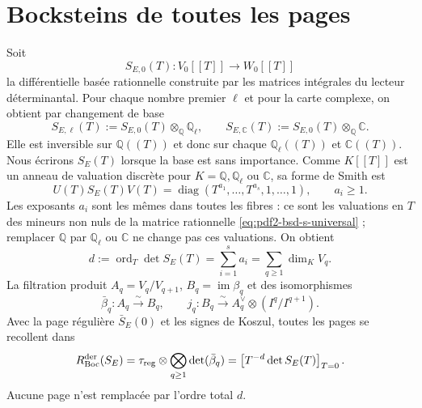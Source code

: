 \section{Bocksteins de toutes les pages}

Soit
\begin{equation}\label{eq:pdf2-bsd-s-universal}
 S_{E,0}(T):V_0[[T]]\longrightarrow W_0[[T]]
\end{equation}
la différentielle basée rationnelle construite par les matrices intégrales du
lecteur déterminantal. Pour chaque nombre premier $\ell$ et pour la carte complexe, on
obtient par changement de base
\begin{equation}\label{eq:pdf2-bsd-s-todos-ell}
 S_{E,\ell}(T):=S_{E,0}(T)\otimes_{\mathbb Q}\mathbb Q_\ell,
 \qquad
 S_{E,\mathbb C}(T):=S_{E,0}(T)\otimes_{\mathbb Q}\mathbb C.
\end{equation}
Elle est inversible sur $\mathbb Q((T))$ et donc sur chaque
$\mathbb Q_\ell((T))$ et $\mathbb C((T))$. Nous écrirons $S_E(T)$ lorsque la
base est sans importance. Comme $K[[T]]$ est un anneau de valuation discrète pour
$K=\mathbb Q,\mathbb Q_\ell$ ou $\mathbb C$, sa forme de Smith est
\begin{equation}\label{eq:pdf2-bsd-smith-t-adico}
 U(T)S_E(T)V(T)=\operatorname{diag}
 (T^{a_1},\ldots,T^{a_s},1,\ldots,1),
 \qquad a_i\ge1.
\end{equation}
Les exposants $a_i$ sont les mêmes dans toutes les fibres : ce sont les valuations
en $T$ des mineurs non nuls de la matrice rationnelle
\eqref{eq:pdf2-bsd-s-universal} ; remplacer $\mathbb Q$ par
$\mathbb Q_\ell$ ou $\mathbb C$ ne change pas ces valuations.
On obtient
\begin{equation}\label{eq:pdf2-bsd-orden-smith}
 d:=\operatorname{ord}_T\det S_E(T)
 =\sum_{i=1}^sa_i
 =\sum_{q\ge1}\dim_K V_q.
\end{equation}
La filtration produit $A_q=V_q/V_{q+1}$,
$B_q=\operatorname{im}\beta_q$ et des isomorphismes
\begin{equation}\label{eq:pdf2-bsd-bockstein-reducido}
 \bar\beta_q:A_q\xrightarrow{\sim}B_q,
 \qquad
 j_q:B_q\xrightarrow{\sim}A_q^\vee\otimes(I^q/I^{q+1}).
\end{equation}
Avec la page régulière $\bar S_E(0)$ et les signes de Koszul, toutes les
pages se recollent dans
\begin{equation}\label{eq:pdf2-bsd-rboc-lt}
 R_{\rm Boc}^{\rm der}(S_E)
 =\tau_{\rm reg}\otimes\bigotimes_{q\ge1}\det(\bar\beta_q)
 =\left[T^{-d}\det S_E(T)\right]_{T=0}.
\end{equation}
Aucune page n'est remplacée par l'ordre total $d$.

